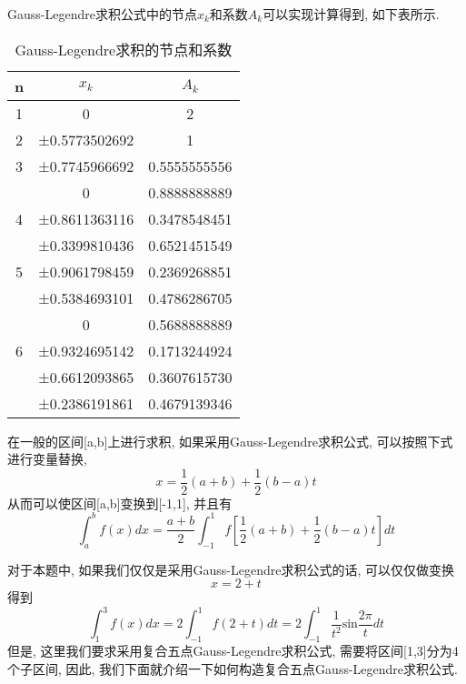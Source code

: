 \documentclass[a4paper]{article}
\begin{document}
\begin{spacing}{1.5}
\begin{CJK*}{GBK}{song}
Gauss-Legendre求积公式中的节点$x_k$和系数$A_k$可以实现计算得到, 如下表所示.

\begin{table}[!htpb]
\begin{center}
\begin{spacing}{1.1}
\caption{Gauss-Legendre求积的节点和系数}\label{node_coef}
\begin{tabular}{ccc}

\toprule
n& $x_k$& $A_k$ \\
\midrule
1 &	0	              & 2 \\ \hline
2 & ±0.5773502692	  & 1 \\  \hline
3 & ±0.7745966692     & 0.5555555556 \\
  &  0                & 0.8888888889 \\  \hline
4 & ±0.8611363116     & 0.3478548451 \\
  & ±0.3399810436     & 0.6521451549 \\  \hline

5 &±0.9061798459      & 0.2369268851 \\
  &±0.5384693101      & 0.4786286705 \\
  &0                  & 0.5688888889 \\ \hline
6 &±0.9324695142      & 0.1713244924 \\
  &±0.6612093865      & 0.3607615730 \\
  &±0.2386191861	  & 0.4679139346 \\
\bottomrule
\end{tabular}
\end{spacing}
\end{center}
\end{table}
在一般的区间[a,b]上进行求积, 如果采用Gauss-Legendre求积公式, 可以按照下式进行变量替换,
\begin{equation}\label{vartrans}
  x=\frac{1}{2}(a+b)+\frac{1}{2}(b-a)t
\end{equation}
从而可以使区间[a,b]变换到[-1,1], 并且有
\begin{equation}\label{gl_trans}
  \int_{a}^b f(x)dx = \frac{a+b}{2}\int_{-1}^1 f\left[\frac{1}{2}(a+b)+\frac{1}{2}(b-a)t\right]dt
\end{equation}

对于本题中, 如果我们仅仅是采用Gauss-Legendre求积公式的话, 可以仅仅做变换
\begin{equation}\label{vartrans_t}
  x=2+t
\end{equation}
得到
\begin{equation}\label{gl_trans}
  \int_{1}^3 f(x)dx =2\int_{-1}^1 f(2+t)dt =2\int_{-1}^1 \frac{1}{t^2}\text{sin}\frac{2\pi}{t}dt
\end{equation}
但是, 这里我们要求采用复合五点Gauss-Legendre求积公式, 需要将区间[1,3]分为4个子区间, 因此, 我们下面就介绍一下如何构造复合五点Gauss-Legendre求积公式.


\end{CJK*}
\end{spacing}
\end{document}

